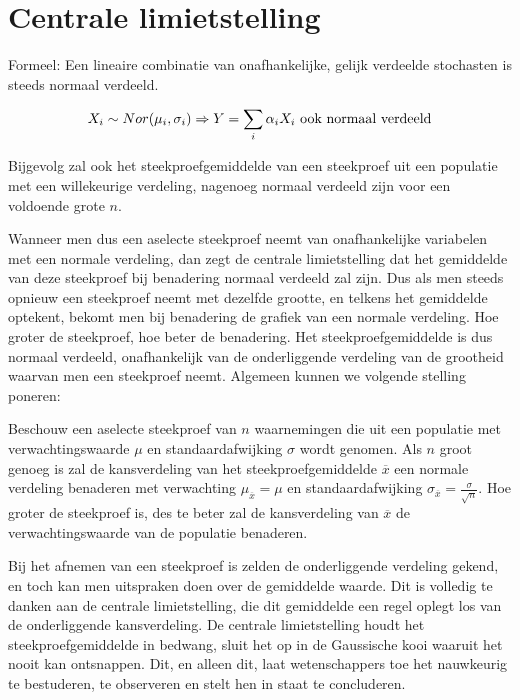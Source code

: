 {\section{Centrale limietstelling}
\label{sec:centrale-limietstelling}

\begin{definition}
Formeel: Een lineaire combinatie van onafhankelijke, gelijk verdeelde stochasten is steeds normaal verdeeld.

\[X_{i} \sim Nor(\mu_{i}, \sigma_{i}) \Rightarrow Y = \sum_{i} \alpha_{i} X_{i} \textnormal{ ook normaal verdeeld} \]

Bijgevolg zal ook het steekproefgemiddelde van een steekproef uit een populatie met een willekeurige verdeling, nagenoeg normaal verdeeld zijn voor een voldoende grote $n$.
\end{definition}

Wanneer men dus een aselecte steekproef neemt van onafhankelijke variabelen met een normale verdeling, dan zegt de centrale limietstelling dat het gemiddelde van deze steekproef bij benadering normaal verdeeld zal zijn. Dus als men steeds opnieuw een steekproef neemt met dezelfde grootte, en telkens het gemiddelde optekent, bekomt men bij benadering de grafiek van een normale verdeling. Hoe groter de steekproef, hoe beter de benadering. Het steekproefgemiddelde is dus normaal verdeeld, onafhankelijk van de onderliggende verdeling van de grootheid waarvan men een steekproef neemt. Algemeen kunnen we volgende stelling poneren:

\begin{definition}
Beschouw een aselecte steekproef van $n$ waarnemingen die uit een populatie met verwachtingswaarde $\mu$ en standaardafwijking $\sigma$ wordt genomen. Als $n$ groot genoeg is zal de kansverdeling van het steekproefgemiddelde $\overline{x}$ een normale verdeling benaderen met verwachting $\mu_{\overline{x}} = \mu$ en standaardafwijking $\sigma_{\overline{x}} = \frac{\sigma}{\sqrt{n}}$. Hoe groter de steekproef is, des te beter zal de kansverdeling van $\overline{x}$ de verwachtingswaarde van de populatie benaderen.

\end{definition}

Bij het afnemen van een steekproef is zelden de onderliggende verdeling gekend, en toch kan men uitspraken doen over de gemiddelde waarde. Dit is volledig te danken aan de centrale limietstelling, die dit gemiddelde een regel oplegt los van de onderliggende kansverdeling. De centrale limietstelling houdt het steekproefgemiddelde in bedwang, sluit het op in de Gaussische kooi waaruit het nooit kan ontsnappen. Dit, en alleen dit, laat wetenschappers toe het nauwkeurig te bestuderen, te observeren en stelt hen in staat te concluderen.

}
